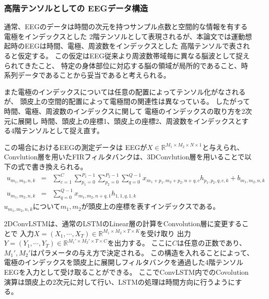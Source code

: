 \subsubsection{\mc 高階テンソルとしての \rm EEG\mc データ構造}
通常、EEGのデータは時間の次元を持つサンプル点数と空間的な情報を有する電極をインデックスとした
2階テンソルとして表現されるが、本論文では運動想起時のEEGは時間、電極、周波数をインデックスとした
高階テンソルで表されると仮定する。
この仮定はEEG従来より周波数帯域毎に異なる脳波として捉えられてきたこと、
特定の身体部位に対応する脳の領域が局所的であること、時系列データであることから妥当であると考えられる。

また電極のインデックスについては任意の配置によってテンソル化がなされるが、
頭皮上の空間的配置によって電極間の関連性は異なっている。
したがって時間、電極、周波数のインデックスに関して
電極のインデックスの取り方を2次元に展開し
時間、頭皮上の座標1、頭皮上の座標2、周波数をインデックスとする4階テンソルとして捉え直す。

この場合におけるEEGの測定データは
EEGが\(X\in \mathbb R^{M_1\times M_2\times N\times 1}\)と与えられ、
Convlution層を用いたFIRフィルタバンクは、3DConvlution層を用いることで以下の式で書き換えられる。
\begin{eqnarray}
    u_{m_1,m_2,n,k}& = &\sum_{c=1}^C\sum_{p_1=0}^{P_1-1}\sum_{p_2=0}^{P_2-1}\sum_{q=0}^{Q-1} x_{m_1+p_1,m_2+p_2,n+q,c} h_{p_1,p_2,q,c,k} + b_{m_1,m_2,n,k}\\
    u_{m_1,m_2,n,k}& = &\sum_{q=0}^{Q-1} x_{m_1,m_2,n+q,1} h_{1,1,q,1,k}
    \label{eq:pseudoFIR3D}
\end{eqnarray} 
\(u_{m_1,m_2,n,k}\)について\(m_1,m_2\)が頭皮上の座標を表すインデックスである。

2DConvLSTMは、通常のLSTMのLinear層の計算をConvolution層に変更することで
入力\(X = (X_1,\cdots,X_T)\in \mathbb R^{M_1 \times M_2 \times T \times K}\)を受け取り
出力\(Y = (Y_1,\cdots,Y_T)\in \mathbb R^{M_1' \times M_2' \times T \times C}\)を出力する。
ここに\(C\)は任意の正数であり、\(M_1',M_2'\)はパラメータの与え方で決定される。
この構造を入れることによって、
電極のインデックスを頭皮上に展開しフィルタバンクを通過した4階テンソルEEGを入力として受け取ることができる。
ここでConvLSTM内でのCovolution演算は頭皮上の2次元に対して行い、LSTMの処理は時間方向に行うようにする。

